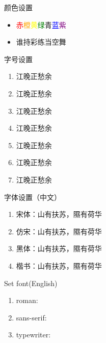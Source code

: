 \documentclass[dvipsnames, svgnames,a4paper,11pt]{article}
\begin{document}
\begin{tbox}{颜色设置}
\begin{itemize}
	\item  \textcolor{Red}{赤}\textcolor{Orange}{橙}\textcolor{Yellow}{黄}\textcolor{Green}{绿}\textcolor{Emerald}{青}\textcolor{Blue}{蓝}\textcolor{Purple}{紫}
	\item  谁持彩练当空舞
\end{itemize}
\end{tbox}

\begin{tbox}{字号设置}
\begin{enumerate}
	\item {\LARGE 江晚正愁余}
	\item {\Large 江晚正愁余}
	\item {\large 江晚正愁余}
	\item {\normalsize 江晚正愁余}
	\item {\small 江晚正愁余}
	\item {\footnotesize 江晚正愁余}
	\item {\scriptsize 江晚正愁余}
\end{enumerate}
\end{tbox}

\begin{tbox}{字体设置（中文）}
\begin{enumerate}
	\item 宋体：{\songti 山有扶苏，隰有荷华}
	\item 仿宋：{\fangsong 山有扶苏，隰有荷华}
	\item 黑体：{\heiti 山有扶苏，隰有荷华}
	\item 楷书：{\kaishu 山有扶苏，隰有荷华}
\end{enumerate}
\end{tbox}

\begin{tbox}{Set font(English)}
\begin{enumerate}
	\item roman:
	\item sans-serif:
	\item typewriter:
\end{enumerate}
\end{tbox}
\end{document}

